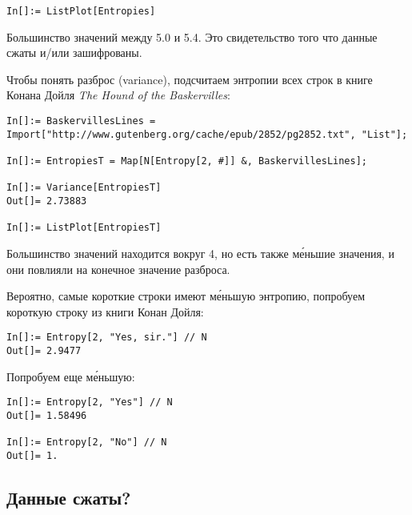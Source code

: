 \begin{lstlisting}
In[]:= ListPlot[Entropies]
\end{lstlisting}

\begin{figure}[H]
\centering
{}
\end{figure}

Большинство значений между 5.0 и 5.4.
Это свидетельство того что данные сжаты и/или зашифрованы.

Чтобы понять разброс (variance), подсчитаем энтропии всех строк в книге Конана Дойля \emph{The Hound of the Baskervilles}:

\begin{lstlisting}
In[]:= BaskervillesLines = Import["http://www.gutenberg.org/cache/epub/2852/pg2852.txt", "List"];

In[]:= EntropiesT = Map[N[Entropy[2, #]] &, BaskervillesLines];

In[]:= Variance[EntropiesT]
Out[]= 2.73883

In[]:= ListPlot[EntropiesT]
\end{lstlisting}

\begin{figure}[H]
\centering
{}
\end{figure}

Большинство значений находится вокруг 4, но есть также м\'{е}ньшие значения, и они повлияли на конечное значение разброса.

Вероятно, самые короткие строки имеют м\'{е}ньшую энтропию, попробуем короткую строку из книги Конан Дойля:

\begin{lstlisting}
In[]:= Entropy[2, "Yes, sir."] // N
Out[]= 2.9477
\end{lstlisting}

Попробуем еще м\'{е}ньшую:

\begin{lstlisting}
In[]:= Entropy[2, "Yes"] // N
Out[]= 1.58496

In[]:= Entropy[2, "No"] // N
Out[]= 1.
\end{lstlisting}

\subsection{Данные сжаты?}

